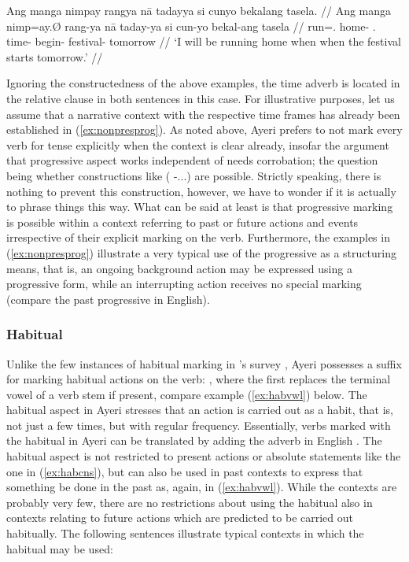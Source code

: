 \a\label{ex:futprog}\begingl
	\gla Ang manga nimpay rangya nā tadayya si cunyo bekalang tasela. //
	\glb Ang manga nimp=ay.Ø rang-ya nā taday-ya si cun-yo bekal-ang 
		tasela //
	\glc \AgtT{} \Prog{} run=\Fsg{}.\Top{} home-\Loc{} \Fsg{}.\Gen{} 
		time-\Loc{} \Rel{} begin-\TsgN{} festival-\Aarg{} tomorrow //
	\glft `I will be running home when when the festival starts 
		tomorrow.' //
\endgl

\xe

Ignoring the constructedness of the above examples, the time adverb is located 
in the relative clause in both sentences in this case. For illustrative 
purposes, let us assume that a narrative context with the respective time 
frames has already been established in (\ref{ex:nonpresprog}). As noted above, 
Ayeri prefers to not mark every verb for tense explicitly when the context is 
clear already, insofar the argument that progressive aspect works independent 
of  needs corrobation; the question being whether constructions like 
 (\Prog{} \Pst{}-...) are possible. Strictly 
speaking, there is nothing to prevent this construction, however, we have to 
wonder if it is actually  to phrase things this way. What can be 
said at least is that progressive marking is possible within a context 
referring to past or future actions and events irrespective of their explicit 
marking on the verb. Furthermore, the examples in (\ref{ex:nonpresprog}) 
illustrate a very typical use of the progressive as a structuring means, that 
is, an ongoing background action may be expressed using a progressive form, 
while an interrupting action receives no special marking (compare the past 
progressive in English).


\subsubsection{Habitual}

Unlike the few instances of habitual marking in \citeauthor{dahl1985}'s survey
\citep[96]{dahl1985}, Ayeri possesses a suffix for marking habitual actions on
the verb: , where the first  replaces the terminal vowel
of a verb stem if present, compare example (\ref{ex:habvwl}) below. The
habitual aspect in Ayeri stresses that an action is carried out as a habit,
that is, not just a few times, but with regular frequency. Essentially, verbs
marked with the habitual in Ayeri can be translated by adding the adverb
 in English \citep[97]{dahl1985}. The habitual aspect is not
restricted to present actions or absolute statements like the one in
(\ref{ex:habcns}), but can also be used in past contexts to express that
something  be done in the past as, again, in (\ref{ex:habvwl}).
While the contexts are probably very few, there are no restrictions about using
the habitual also in contexts relating to future actions which are predicted to
be carried out habitually. The following sentences illustrate typical contexts
in which the habitual may be used:

